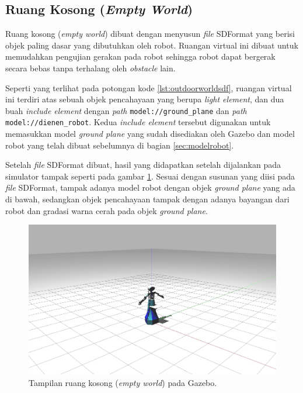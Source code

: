\subsection{Ruang Kosong (\emph{Empty World})}
\label{subsec:lingkunganoutdoor}

Ruang kosong (\emph{empty world}) dibuat dengan menyusun \emph{file} SDFormat yang berisi objek paling dasar yang dibutuhkan oleh robot.
Ruangan virtual ini dibuat untuk memudahkan pengujian gerakan pada robot sehingga robot dapat bergerak secara bebas tanpa terhalang oleh \emph{obstacle} lain.

Seperti yang terlihat pada potongan kode \ref{lst:outdoorworldsdf},
  ruangan virtual ini terdiri atas sebuah objek pencahayaan yang berupa \emph{light element},
  dan dua buah \emph{include element} dengan \emph{path} \lstinline{model://ground_plane} dan \emph{path} \lstinline{model://dienen_robot}.
Kedua \emph{include element} tersebut digunakan untuk memasukkan model \emph{ground plane} yang sudah disediakan oleh Gazebo dan model robot yang telah dibuat sebelumnya di bagian \ref{sec:modelrobot}.



Setelah \emph{file} SDFormat dibuat,
  hasil yang didapatkan setelah dijalankan pada simulator tampak seperti pada gambar \ref{fig:lingkunganoutdoor}.
Sesuai dengan susunan yang diisi pada \emph{file} SDFormat,
  tampak adanya model robot dengan objek \emph{ground plane} yang ada di bawah,
  sedangkan objek pencahayaan tampak dengan adanya bayangan dari robot dan gradasi warna cerah pada objek \emph{ground plane}.

\begin{figure}[ht]
  \centering
  \includegraphics[scale=0.23]{gambar/lingkungan-outdoor.png}
  \caption{Tampilan ruang kosong (\emph{empty world}) pada Gazebo.}
  \label{fig:lingkunganoutdoor}
\end{figure}
